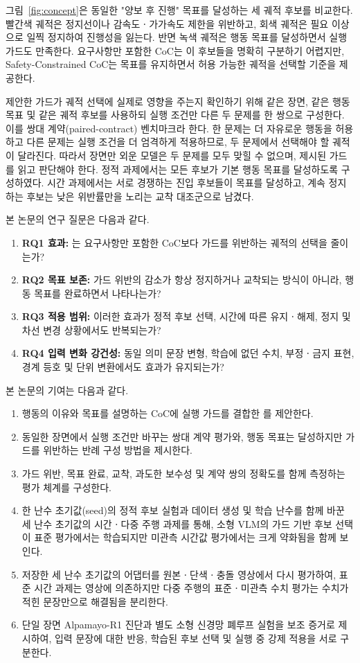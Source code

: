 그림~\ref{fig:concept}은 동일한 "양보 후 진행" 목표를 달성하는 세 궤적 후보를 비교한다. 빨간색 궤적은 정지선이나 감속도ㆍ가가속도 제한을 위반하고, 회색 궤적은 필요 이상으로 일찍 정지하여 진행성을 잃는다. 반면 녹색 궤적은 행동 목표를 달성하면서 실행 가드도 만족한다. 요구사항만 포함한 CoC는 이 후보들을 명확히 구분하기 어렵지만, Safety-Constrained CoC는 목표를 유지하면서 허용 가능한 궤적을 선택할 기준을 제공한다.

제안한 가드가 궤적 선택에 실제로 영향을 주는지 확인하기 위해 같은 장면, 같은 행동 목표 및 같은 궤적 후보를 사용하되 실행 조건만 다른 두 문제를 한 쌍으로 구성한다. 이를 쌍대 계약(paired-contract) 벤치마크라 한다. 한 문제는 더 자유로운 행동을 허용하고 다른 문제는 실행 조건을 더 엄격하게 적용하므로, 두 문제에서 선택해야 할 궤적이 달라진다. 따라서 장면만 외운 모델은 두 문제를 모두 맞힐 수 없으며, 제시된 가드를 읽고 판단해야 한다. 정적 과제에서는 모든 후보가 기본 행동 목표를 달성하도록 구성하였다. 시간 과제에서는 서로 경쟁하는 진입 후보들이 목표를 달성하고, 계속 정지하는 후보는 낮은 위반률만을 노리는 교착 대조군으로 남겼다.

본 논문의 연구 질문은 다음과 같다.
\begin{enumerate}
    \item \textbf{RQ1 효과:} \sccoc{}는 요구사항만 포함한 CoC보다 가드를 위반하는 궤적의 선택을 줄이는가?
    \item \textbf{RQ2 목표 보존:} 가드 위반의 감소가 항상 정지하거나 교착되는 방식이 아니라, 행동 목표를 완료하면서 나타나는가?
    \item \textbf{RQ3 적용 범위:} 이러한 효과가 정적 후보 선택, 시간에 따른 유지ㆍ해제, 정지 및 차선 변경 상황에서도 반복되는가?
    \item \textbf{RQ4 입력 변화 강건성:} 동일 의미 문장 변형, 학습에 없던 수치, 부정ㆍ금지 표현, 경계 등호 및 단위 변환에서도 효과가 유지되는가?
\end{enumerate}

본 논문의 기여는 다음과 같다.
\begin{enumerate}
    \item 행동의 이유와 목표를 설명하는 CoC에 실행 가드를 결합한 \sccoc{}를 제안한다.
    \item 동일한 장면에서 실행 조건만 바꾸는 쌍대 계약 평가와, 행동 목표는 달성하지만 가드를 위반하는 반례 구성 방법을 제시한다.
    \item 가드 위반, 목표 완료, 교착, 과도한 보수성 및 계약 쌍의 정확도를 함께 측정하는 평가 체계를 구성한다.
    \item 한 난수 초기값(seed)의 정적 후보 실험과 데이터 생성 및 학습 난수를 함께 바꾼 세 난수 초기값의 시간ㆍ다중 주행 과제를 통해, 소형 VLM의 가드 기반 후보 선택이 표준 평가에서는 학습되지만 미관측 시간값 평가에서는 크게 약화됨을 함께 보인다.
    \item 저장한 세 난수 초기값의 어댑터를 원본ㆍ단색ㆍ충돌 영상에서 다시 평가하여, 표준 시간 과제는 영상에 의존하지만 다중 주행의 표준ㆍ미관측 수치 평가는 수치가 적힌 문장만으로 해결됨을 분리한다.
    \item 단일 장면 Alpamayo-R1 진단과 별도 소형 신경망 폐루프 실험을 보조 증거로 제시하여, 입력 문장에 대한 반응, 학습된 후보 선택 및 실행 중 강제 적용을 서로 구분한다.
\end{enumerate}

